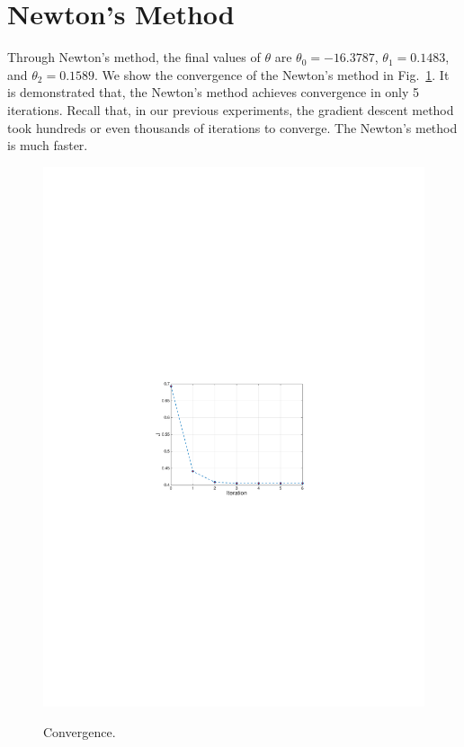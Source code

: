 \documentclass[10pt,a4paper]{article}
\begin{document}
\section{Newton's Method}
%
  Through Newton's method, the final values of $\theta$ are $\theta_0 =  -16.3787$, $\theta_1=0.1483$, and $\theta_2=0.1589$. We show the convergence of the Newton's method in Fig.~\ref{fig:con}. It is demonstrated that, the Newton's method achieves convergence in only 5 iterations. Recall that, in our previous experiments, the gradient descent method took hundreds or even thousands of iterations to converge. The Newton's method is much faster.
  \begin{figure}[htb!]
  \centering
    \includegraphics[width=.7\columnwidth]{convergence} \\ %
  \caption{Convergence.}
  \label{fig:con}
  \end{figure}
\end{document}
